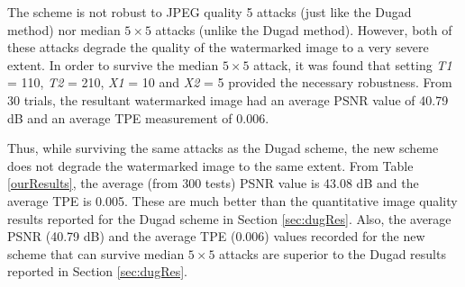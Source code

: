 \documentclass[10pt,twocolumn]{article}
\begin{document}
The scheme is not robust
to JPEG quality 5 attacks (just like the Dugad method) nor median $5 \times 5$ attacks
(unlike the Dugad method). However, both of these
attacks degrade the quality of the watermarked image to a very severe extent.
In order to survive the median $5 \times 5$ attack, it was found that setting 
\emph{T1} = 110, \emph{T2} = 210, \emph{X1} = 10 and \emph{X2} = 5 
provided the necessary robustness. 
From 30 trials, the resultant watermarked image had an average PSNR value of 40.79 dB and an average TPE
measurement of 0.006.
%

Thus, while surviving the same attacks as the Dugad scheme, the new scheme
does not degrade the watermarked image to the same extent. 
From Table \ref{ourResults}, the average (from 300 tests)
PSNR value is 43.08 dB and the average TPE is 0.005. These are much better than the quantitative
image quality results reported for the Dugad scheme in Section
\ref{sec:dugRes}. 
Also, the average PSNR (40.79 dB) and the average TPE (0.006) values recorded for the new scheme 
that can survive median $5 \times 5$ attacks 
are superior to the Dugad results
reported in Section \ref{sec:dugRes}.
\end{document}
